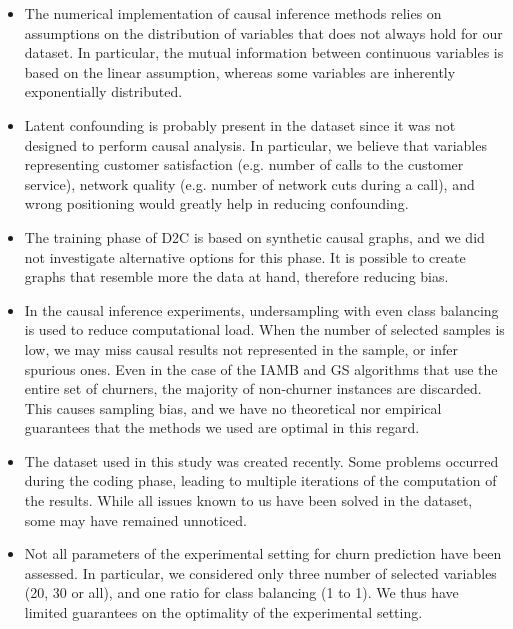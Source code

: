 \begin{itemize}
	\item The numerical implementation of causal inference methods relies on
	assumptions on the distribution of variables that does not always hold for
	our dataset. In particular, the mutual information between continuous
	variables is based on the linear assumption, whereas some variables are
	inherently exponentially distributed.

    \item Latent confounding is probably present in the dataset since it was not
    designed to perform causal analysis. In particular, we believe that
    variables representing customer satisfaction (e.g. number of calls to the
    customer service), network quality (e.g. number of network cuts during a
    call), and wrong positioning would greatly help in reducing confounding.

	\item The training phase of D2C is based on synthetic causal graphs, and we
	did not investigate alternative options for this phase. It is possible to
	create graphs that resemble more the data at hand, therefore reducing bias.

	\item In the causal inference experiments, undersampling with even class
	balancing is used to reduce computational load. When the number of selected
	samples is low, we may miss causal results not represented in the sample, or
	infer spurious ones. Even in the case of the IAMB and GS algorithms that use
	the entire set of churners, the majority of non-churner instances are
	discarded. This causes sampling bias, and we have no theoretical nor
	empirical guarantees that the methods we used are optimal in this regard.

	\item The dataset used in this study was created recently. Some problems
	occurred during the coding phase, leading to multiple iterations of the
	computation of the results. While all issues known to us have been solved
	in the dataset, some may have remained unnoticed.

	\item Not all parameters of the experimental setting for churn prediction
	have been assessed. In particular, we considered only three number of
	selected variables (20, 30 or all), and one ratio for class balancing (1 to
	1). We thus have limited guarantees on the optimality of the experimental
	setting.

\end{itemize}

